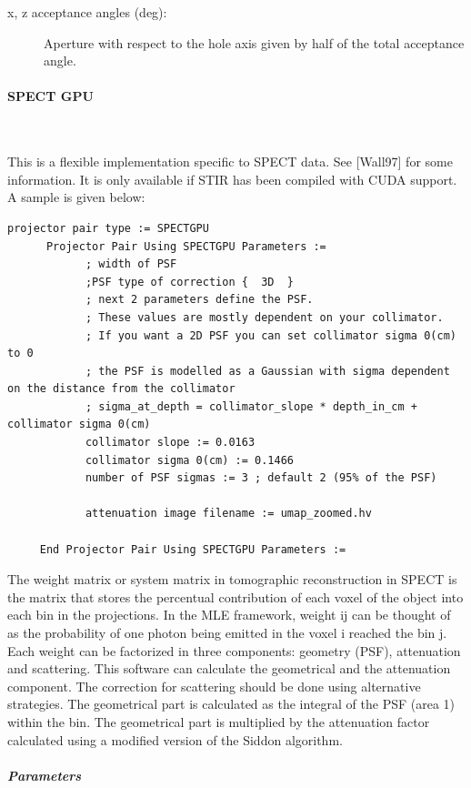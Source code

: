 \documentclass{article}
\newcommand{\subsubsubsection}[1]{\paragraph{#1}\mbox{} \\}
\newcommand{\subsubsubsubsection}[1]{\subparagraph{#1} \mbox{} \\}
\begin{document}
{{{{{{\begin{description}
\begin{description}
\item[x, z acceptance angles (deg):] Aperture with respect to the hole axis given by half of the total acceptance angle.

\end{description}
\end{description}

{ \subsubsubsection{SPECT GPU} }
\label{sec:projmatrixSPECTGPU}
This is a flexible implementation specific to SPECT data. See [Wall97] for some information.
It is only available if STIR has been compiled with CUDA support.
A sample is given below:

\begin{verbatim}
projector pair type := SPECTGPU
      Projector Pair Using SPECTGPU Parameters :=
            ; width of PSF
            ;PSF type of correction {  3D  }
            ; next 2 parameters define the PSF.
            ; These values are mostly dependent on your collimator.
            ; If you want a 2D PSF you can set collimator sigma 0(cm) to 0
            ; the PSF is modelled as a Gaussian with sigma dependent on the distance from the collimator
            ; sigma_at_depth = collimator_slope * depth_in_cm + collimator sigma 0(cm)
            collimator slope := 0.0163
            collimator sigma 0(cm) := 0.1466
            number of PSF sigmas := 3 ; default 2 (95% of the PSF)

            attenuation image filename := umap_zoomed.hv

     End Projector Pair Using SPECTGPU Parameters :=
\end{verbatim}

The weight matrix or system matrix in tomographic reconstruction in SPECT is the matrix that stores the
percentual contribution of each voxel of the object into each bin in the projections. In the MLE
framework, weight ij can be thought of as the probability of one photon being emitted in the voxel i reached
the bin j. Each weight can be factorized in three components: geometry (PSF), attenuation and scattering.
This software can calculate the geometrical and the attenuation component. The correction for scattering
should be done using alternative strategies. The geometrical part is calculated as the integral of the
PSF (area 1) within the bin. The geometrical part is multiplied by the attenuation factor calculated
using a modified version of the Siddon algorithm.  

{ \subsubsubsubsection{Parameters} }
\begin{description}


\end{description}}}}}}}
\end{document}
